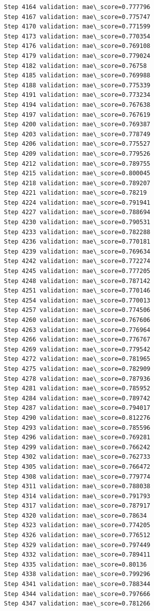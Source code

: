 \documentclass[11pt]{article}
\begin{document}
\begin{Verbatim}[commandchars=\\\{\}]
Step 4164 validation: mae\_score=0.777796
Step 4167 validation: mae\_score=0.775747
Step 4170 validation: mae\_score=0.771599
Step 4173 validation: mae\_score=0.770354
Step 4176 validation: mae\_score=0.769108
Step 4179 validation: mae\_score=0.779024
Step 4182 validation: mae\_score=0.76758
Step 4185 validation: mae\_score=0.769988
Step 4188 validation: mae\_score=0.775339
Step 4191 validation: mae\_score=0.773234
Step 4194 validation: mae\_score=0.767638
Step 4197 validation: mae\_score=0.767619
Step 4200 validation: mae\_score=0.769387
Step 4203 validation: mae\_score=0.778749
Step 4206 validation: mae\_score=0.775527
Step 4209 validation: mae\_score=0.779526
Step 4212 validation: mae\_score=0.789755
Step 4215 validation: mae\_score=0.800045
Step 4218 validation: mae\_score=0.789207
Step 4221 validation: mae\_score=0.78219
Step 4224 validation: mae\_score=0.791941
Step 4227 validation: mae\_score=0.788694
Step 4230 validation: mae\_score=0.790531
Step 4233 validation: mae\_score=0.782288
Step 4236 validation: mae\_score=0.770181
Step 4239 validation: mae\_score=0.769634
Step 4242 validation: mae\_score=0.772274
Step 4245 validation: mae\_score=0.777205
Step 4248 validation: mae\_score=0.787142
Step 4251 validation: mae\_score=0.770146
Step 4254 validation: mae\_score=0.770013
Step 4257 validation: mae\_score=0.774506
Step 4260 validation: mae\_score=0.767606
Step 4263 validation: mae\_score=0.776964
Step 4266 validation: mae\_score=0.776767
Step 4269 validation: mae\_score=0.779542
Step 4272 validation: mae\_score=0.781965
Step 4275 validation: mae\_score=0.782909
Step 4278 validation: mae\_score=0.787936
Step 4281 validation: mae\_score=0.785952
Step 4284 validation: mae\_score=0.789742
Step 4287 validation: mae\_score=0.794017
Step 4290 validation: mae\_score=0.812276
Step 4293 validation: mae\_score=0.785596
Step 4296 validation: mae\_score=0.769281
Step 4299 validation: mae\_score=0.766242
Step 4302 validation: mae\_score=0.762733
Step 4305 validation: mae\_score=0.766472
Step 4308 validation: mae\_score=0.779774
Step 4311 validation: mae\_score=0.788038
Step 4314 validation: mae\_score=0.791793
Step 4317 validation: mae\_score=0.787917
Step 4320 validation: mae\_score=0.78634
Step 4323 validation: mae\_score=0.774205
Step 4326 validation: mae\_score=0.776512
Step 4329 validation: mae\_score=0.797449
Step 4332 validation: mae\_score=0.789411
Step 4335 validation: mae\_score=0.80136
Step 4338 validation: mae\_score=0.799296
Step 4341 validation: mae\_score=0.788344
Step 4344 validation: mae\_score=0.797666
Step 4347 validation: mae\_score=0.781266

\end{Verbatim}
\end{document}
